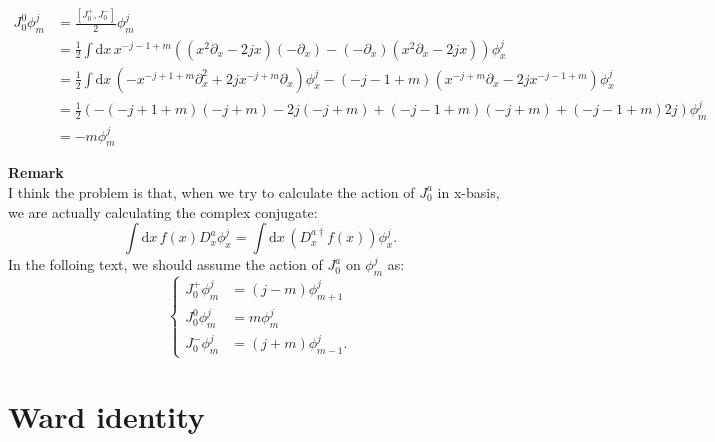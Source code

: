 \documentclass[10pt,a4paper]{article}
\numberwithin{equation}{section}
\begin{document}
\begin{equation}
    \begin{aligned}
    J^{0}_{0} \phi^{j}_{m} &= \frac{\left[ J^{+}_{0},J^{-}_{0}\right]}{2} \phi^{j}_{m}\\
    &= \frac{1}{2} \int \mathrm{d} x \, x^{-j-1+m} \left((x^{2} \partial_{x} -2 j x)(-\partial_{x}) - (-\partial_{x})(x^{2} \partial_{x} - 2 j x) \right)\phi^{j}_{x}\\
    &= \frac{1}{2} \int \mathrm{d} x \, \left( -x^{-j+1+m} \partial_{x}^{2} + 2 j x^{-j+m} \partial_{x} \right) \phi^{j}_{x} -(-j-1+m) \left( x^{-j+m} \partial_{x} -2j x^{-j-1+m} \right)\phi^{j}_{x}\\
    &= \frac{1}{2} \left( -(-j+1+m)(-j+m) - 2 j (-j+m) + (-j-1+m)(-j+m) +(-j-1+m)2j \right) \phi^{j}_{m}\\
    &= -m \phi^{j}_{m}
    \end{aligned}
\end{equation}

\textbf{Remark}\\
I think the problem is that, when we try to calculate the action of $J^{a}_{0}$ in x-basis, we are actually calculating the complex conjugate:
\begin{equation}
    \int \mathrm{d} x \, f(x) D^{a}_{x} \phi^{j}_{x} = \int \mathrm{d} x \, \left(D^{a \dagger}_{x} f(x) \right) \phi^{j}_{x}.
\end{equation}
In the folloing text, we should assume the action of $J^{a}_{0}$ on $\phi^{j}_{m}$ as:
\begin{equation}
    \left\{
    \begin{aligned}
    J^{+}_{0} \phi^{j}_{m} &= (j-m) \phi^{j}_{m+1}\\
    J^{0}_{0} \phi^{j}_{m} &= m \phi^{j}_{m}\\
    J^{-}_{0} \phi^{j}_{m} &= (j+m) \phi^{j}_{m-1}.
    \end{aligned} \label{eq1}
    \right.
\end{equation}


\section{Ward identity}
\end{document}
